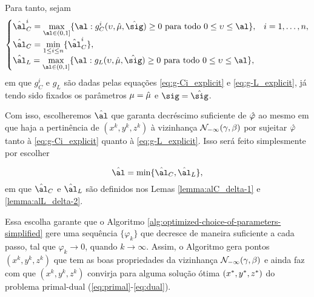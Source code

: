 Para tanto, sejam  
\begin{equation}
	\label{eq:al-C+al-L}
\begin{cases}
	\hat{\al}_{C}^{i} = \displaystyle \max_{\al\in (0,1]} \{ \al : g_{C}^{i}(\upsilon,\nextmu,\nextsig)\geq0 \text{ para todo } 0 \leq \upsilon\leq \al  \}, & i = 1,\ldots,n,\\
	\hat{\al}_{C} = \displaystyle \min_{1\leq i \leq n} \{\hat{\al}_{C}^{i}\}, \\
	\hat{\al}_{L} = \displaystyle \max_{\al\in (0,1]} \{ \al : g_{L}(\upsilon,\nextmu,\nextsig)\geq0 \text{ para todo } 0 \leq  \upsilon\leq \al  \},
\end{cases}
\end{equation}
em que $g_{C}^{i}$ e $g_{L}$ são dadas pelas equações  \eqref{eq:g-Ci_explicit} e \eqref{eq:g-L_explicit}, já tendo sido fixados os parâmetros $\mu=\hat{\mu}$ e $\sig=\nextsig$.


Com isso, escolheremos  $\hat\al$ que garanta decréscimo suficiente de $\hat{\varphi}$ ao mesmo em que haja a pertinência de $({x}^{k} ,{y}^{k},{z}^{k})$ à vizinhança $\mathcal{N}_{-\infty}(\gamma,\beta)$ por sujeitar $\hat{\varphi}$ tanto à  \eqref{eq:g-Ci_explicit} quanto à \eqref{eq:g-L_explicit}. Isso será feito simplesmente por escolher

\begin{equation}
	\label{eq:nex-al}
\nextal = \min\{\nextal_{C},\nextal_{L}\},
\end{equation}
em que $\nextal_{C}$ e $\nextal_{L}$ são definidos nos Lemas \ref{lemma:alC_delta-1} e  \ref{lemma:alL_delta-2}.

  




 Essa escolha garante que  o Algoritmo \ref{alg:optimized-choice-of-parameters-simplified} gere uma sequência $\{\varphi_k\}$ que decresce de maneira suficiente a cada passo, tal que $\varphi_k \to 0$, quando $k\to \infty$. Assim, o Algoritmo gera pontos $({x}^{k} ,{y}^{k},{z}^{k})$ que tem as boas propriedades da vizinhança $\mathcal{N}_{-\infty}(\gamma,\beta)$ e ainda faz com que $({x}^{k} ,{y}^{k},{z}^{k})$ convirja para  alguma solução ótima $(x^* ,y^*,z^*)$ do problema primal-dual  (\ref{eq:primal}-\ref{eq:dual}).


